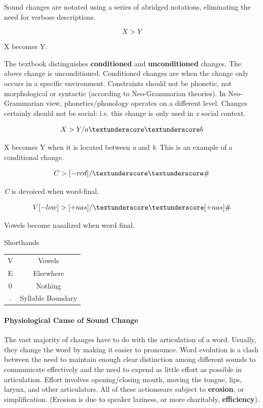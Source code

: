 \documentclass{exam}
\newcommand{\morespace}{\vspace{+2mm}}
\begin{document}
Sound changes are notated using a series of abridged notations, eliminating the need for verbose descriptions. 


$$X >Y$$
\begin{center}
X becomes Y.
\end{center}


The textbook distinguishes \textbf{conditioned} and \textbf{unconditioned} changes. The above change is unconditioned. Conditioned changes are when the change only occurs in a specific environment. Constraints should not be phonetic, not morphological or syntactic (according to Neo-Grammarian theories). In Neo-Grammarian view, phonetics/phonology operates on a different level. Changes certainly should not be social: i.e. this change is only used in \textit{x} social context. 

$$X >Y/a \textunderscore\textunderscore b$$

\begin{center}
X becomes Y when it is located between \textit{a} and \textit{b}. This is an example of a conditional change. 
\end{center}


$$C>[-vcd]/\textunderscore\textunderscore \#$$

\begin{center}
\textit{C} is devoiced when word-final.  
\end{center}


$$V[-low] > [+nas]/ \textunderscore\textunderscore [+nas]\#$$


\begin{center}
Vowels become nasalized when word final. 
\end{center}


\begin{center}

Shorthands \morespace

\begin{tabular}{c|c}
     V&Vowels  \\
     E&Elsewhere\\
     0&Nothing\\
     .&Syllable Boundary\\
\end{tabular}
\end{center}



\paragraph{Physiological Cause of Sound Change} The vast majority of changes have to do with the articulation of a word. Usually, they change the word by making it easier to pronounce. Word evolution is a clash between the need to maintain enough clear distinction among different sounds to communicate effectively and the need to expend as little effort as possible in articulation. Effort involves opening/closing mouth, moving the tongue, lips, larynx, and other articulators. All of these actionseare subject to \textbf{erosion}, or simplification. (Erosion is due to speaker laziness, or more charitably, \textbf{efficiency}). 
\end{document}

